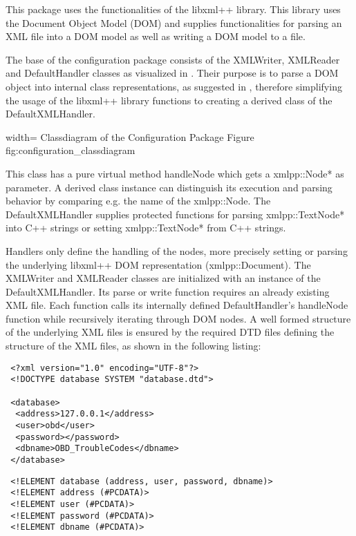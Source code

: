 This package uses the functionalities of the libxml++ \cite{XMLLIB} library. This library uses the Document Object Model (DOM) and supplies functionalities 
for parsing an XML file into a DOM model as well as writing a DOM model to a file. 

The base of the configuration package consists of the XMLWriter, XMLReader and DefaultHandler classes as visualized in . 
Their purpose is to parse a DOM object into internal class representations, as suggested in , therefore simplifying the usage of the 
libxml++ library functions to creating a derived class of the DefaultXMLHandler. 

 {width=\textwidth}%
 {Classdiagram of the Configuration Package}%
 {Figure}%
 {fig:configuration_classdiagram}%

This class has a pure virtual method handleNode which gets a xmlpp::Node* as parameter. A derived class instance can distinguish its execution 
and parsing behavior by comparing e.g. the name of the xmlpp::Node. The DefaultXMLHandler supplies protected functions for parsing 
xmlpp::TextNode* into C++ strings or setting xmlpp::TextNode* from C++ strings. 

Handlers only define the handling of the nodes, more precisely setting or parsing the underlying libxml++ DOM representation (xmlpp::Document). 
The XMLWriter and XMLReader classes are initialized with an instance of the DefaultXMLHandler. Its parse or write function requires an already 
existing XML file. Each function calls its internally defined DefaultHandler’s handleNode function while recursively iterating through DOM nodes. 
A well formed structure of the underlying XML files is ensured by the required DTD files defining the structure of the XML files, as shown in the following listing:

\begin{verbatim}
 <?xml version="1.0" encoding="UTF-8"?>
 <!DOCTYPE database SYSTEM "database.dtd">

 <database>
  <address>127.0.0.1</address>
  <user>obd</user>
  <password></password>
  <dbname>OBD_TroubleCodes</dbname>
 </database>
\end{verbatim}

\begin{verbatim}
 <!ELEMENT database (address, user, password, dbname)>
 <!ELEMENT address (#PCDATA)>
 <!ELEMENT user (#PCDATA)>
 <!ELEMENT password (#PCDATA)>
 <!ELEMENT dbname (#PCDATA)>
\end{verbatim}

